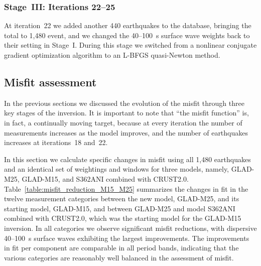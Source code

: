 \documentclass[extra,mreferee]{gji}
\begin{document}

\subsubsection{Stage~III: Iterations 22--25}

At iteration~22 we added another 440 earthquakes to the database,
bringing the total to 1,480 event,
and we changed the 40--100~s surface wave weights back to their setting in Stage~I.
During this stage we switched from a nonlinear conjugate gradient optimization algorithm to an L-BFGS quasi-Newton method.

\subsection{Misfit assessment}
\label{section:Misfit assessment}

In the previous sections we discussed the evolution of the misfit through three key stages of the inversion.
It is important to note that ``the misfit function'' is, in fact, a continually moving target, because at every iteration the number of measurements increases as the model improves,
and the number of earthquakes increases at iterations~18 and~22.

In this section we calculate specific changes in misfit using all 1,480 earthquakes and an identical set of weightings and windows for three models, namely, GLAD-M25, GLAD-M15, and S362ANI combined with CRUST2.0.
Table~\ref{table:misfit_reduction_M15_M25} summarizes the changes in fit in the twelve measurement categories
between the new model, GLAD-M25, and its starting model, GLAD-M15, and between GLAD-M25 and model S362ANI combined with CRUST2.0, which was the starting model for the GLAD-M15 inversion.
In all categories we observe significant misfit reductions,
with dispersive 40--100~s surface waves exhibiting the largest improvements.
The improvements in fit per component are comparable in all period bands,
indicating that the various categories are reasonably well balanced in the assessment of misfit.
\end{document}
